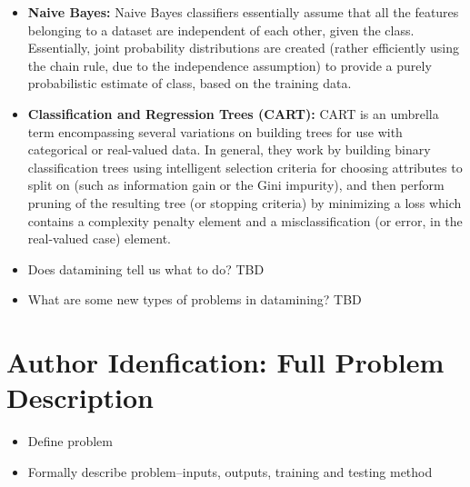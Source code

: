 \documentclass[fleqn,10pt]{SelfArx} %
\begin{document}
\begin{itemize}
	\item{\textbf{Naive Bayes:}} Naive Bayes classifiers essentially assume that all the features belonging to a dataset are independent of each other, given the class.  Essentially, joint probability distributions are created (rather efficiently using the chain rule, due to the independence assumption) to provide a purely probabilistic estimate of class, based on the training data.
	\item{\textbf{Classification and Regression Trees (CART):}} CART is an umbrella term encompassing several variations on building trees for use with categorical or real-valued data.  In general, they work by building binary classification trees using intelligent selection criteria for choosing attributes to split on (such as information gain or the Gini impurity), and then perform pruning of the resulting tree (or stopping criteria) by minimizing a loss which contains a complexity penalty element and a misclassification (or error, in the real-valued case) element.
\end{itemize}

\begin{itemize}[noitemsep]
	\item Does datamining tell us what to do? TBD
	\item What are some new types of problems in datamining? TBD
\end{itemize}




%
%   
\section{Author Idenfication: Full Problem Description}
\begin{itemize}[noitemsep]
\item Define problem
\item Formally describe problem--inputs, outputs, training and testing method
\end{itemize}

\end{document}
